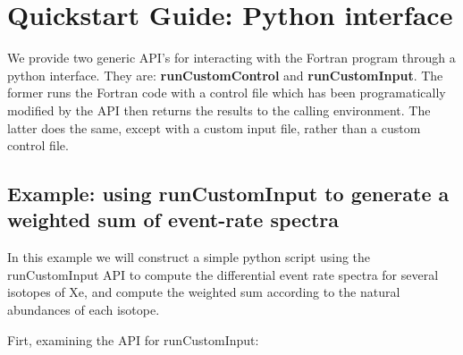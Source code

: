 \documentclass[12pt]{article}
\begin{document}
\clearpage

\section{Quickstart Guide: Python interface}

We provide two generic API's for interacting with the Fortran program through a
python interface. They are: \textbf{runCustomControl} and
\textbf{runCustomInput}. The former runs the Fortran code with a control file
which has been programatically modified by the API then returns the results to
the calling environment. The latter does the same, except with a custom input
file, rather than a custom control file.

\subsection{Example: using runCustomInput to generate a weighted sum of
event-rate spectra}

In this example we will construct a simple python script using the 
runCustomInput API to compute the differential
event rate spectra for several isotopes of Xe, and compute the weighted sum
according to the natural abundances of each isotope.

Firt, examining the API for runCustomInput:
\end{document}
